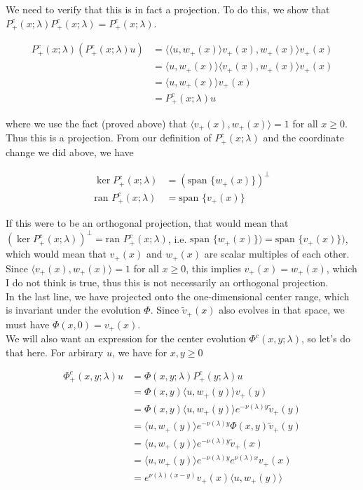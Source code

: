 \documentclass[12pt]{article}
\begin{document}
We need to verify that this is in fact a projection. To do this, we show that $P^c_+(x; \lambda)P^c_+(x; \lambda) = P^c_+(x; \lambda)$.

\begin{align*}
P^c_+(x; \lambda)( P^c_+(x; \lambda) u ) &= \langle \langle u, w_+(x) \rangle v_+(x), w_+(x) \rangle v_+(x) \\
&= \langle u, w_+(x) \rangle \langle v_+(x), w_+(x) \rangle v_+(x) \\
&= \langle u, w_+(x) \rangle v_+(x) \\
&= P^c_+(x; \lambda) u 
\end{align*}

where we use the fact (proved above) that $\langle v_+(x), w_+(x) \rangle = 1$ for all $x \geq 0$. Thus this is a projection. From our definition of $P^c_+(x; \lambda)$ and the coordinate change we did above, we have

\begin{align*}
\ker P^c_+(x; \lambda) &= ( \text{span }\{ w_+(x) \})^\perp\\
\text{ran } P^c_+(x; \lambda) &= \text{span }\{ v_+(x) \}
\end{align*}

If this were to be an orthogonal projection, that would mean that $(\ker P^c_+(x; \lambda))^
\perp = \text{ran } P^c_+(x; \lambda)$, i.e. $\text{span }\{ w_+(x) \}) = \text{span }\{ v_+(x) \})$, which would mean that $v_+(x)$ and $w_+(x)$ are scalar multiples of each other. Since $\langle v_+(x), w_+(x) \rangle = 1$ for all $x \geq 0$, this implies $v_+(x) = w_+(x)$, which I do not think is true, thus this is not necessarily an orthogonal projection.\\

In the last line, we have projected onto the one-dimensional center range, which is invariant under the evolution $\Phi$. Since $\tilde{v}_+(x)$ also evolves in that space, we must have $\Phi(x,0) = v_+(x)$.\\

We will also want an expression for the center evolution $\Phi^c(x,y; \lambda)$, so let's do that here. For arbirary $u$, we have for $x, y \geq 0$

\begin{align*}
\Phi^c_+(x,y; \lambda)u &= \Phi(x,y; \lambda) P^c_+(y; \lambda) u \\
&= \Phi(x,y) \langle u, w_+(y) \rangle v_+(y) \\
&= \Phi(x,y) \langle u, w_+(y) \rangle e^{-\nu(\lambda)y} \tilde{v}_+(y) \\
&= \langle u, w_+(y) \rangle e^{-\nu(\lambda)y} \Phi(x,y) \tilde{v}_+(y) \\
&= \langle u, w_+(y) \rangle e^{-\nu(\lambda)y} \tilde{v}_+(x) \\
&= \langle u, w_+(y) \rangle e^{-\nu(\lambda)y} e^{\nu(\lambda)x} v_+(x) \\
&= e^{\nu(\lambda)(x-y)} v_+(x) \langle u, w_+(y) \rangle 
\end{align*}
\end{document}

